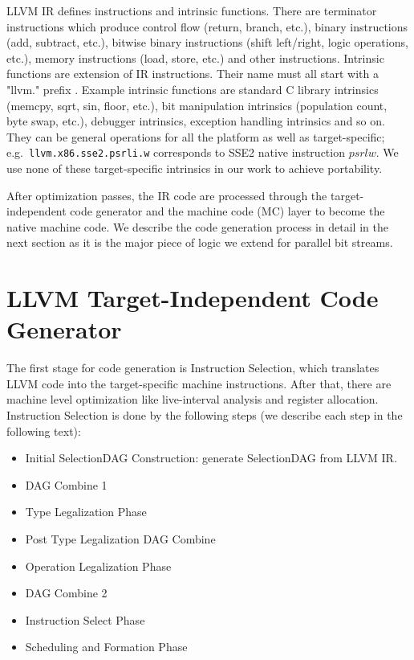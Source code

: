 LLVM IR defines instructions and intrinsic functions. There are terminator instructions which produce control flow (return, branch, etc.), binary instructions (add, subtract, etc.), bitwise binary instructions (shift left/right, logic operations, etc.), memory instructions (load, store, etc.) and other instructions. Intrinsic functions are extension of IR instructions. Their name must all start with a "llvm." prefix \cite{llvm_lang_ref}. Example intrinsic functions are standard C library intrinsics (memcpy, sqrt, sin, floor, etc.), bit manipulation intrinsics (population count, byte swap, etc.), debugger intrinsics, exception handling intrinsics and so on. They can be general operations for all the platform as well as target-specific; e.g.\ {\tt llvm.x86.sse2.psrli.w} corresponds to SSE2 native instruction $psrlw$. We use none of these target-specific intrinsics in our work to achieve portability.

After optimization passes, the IR code are processed through the target-independent code generator and the machine code (MC) layer to become the native machine code. We describe the code generation process in detail in the next section as it is the major piece of logic we extend for parallel bit streams.

\section{LLVM Target-Independent Code Generator}
The first stage for code generation is Instruction Selection, which translates LLVM code into the target-specific machine instructions. After that, there are machine level optimization like live-interval analysis and register allocation. Instruction Selection is done by the following steps \cite{llvm_code_gen} (we describe each step in the following text):

\begin{itemize}
  \item Initial SelectionDAG Construction: generate SelectionDAG from LLVM IR.
  \item DAG Combine 1
  \item Type Legalization Phase
  \item Post Type Legalization DAG Combine
  \item Operation Legalization Phase
  \item DAG Combine 2
  \item Instruction Select Phase
  \item Scheduling and Formation Phase
\end{itemize}

